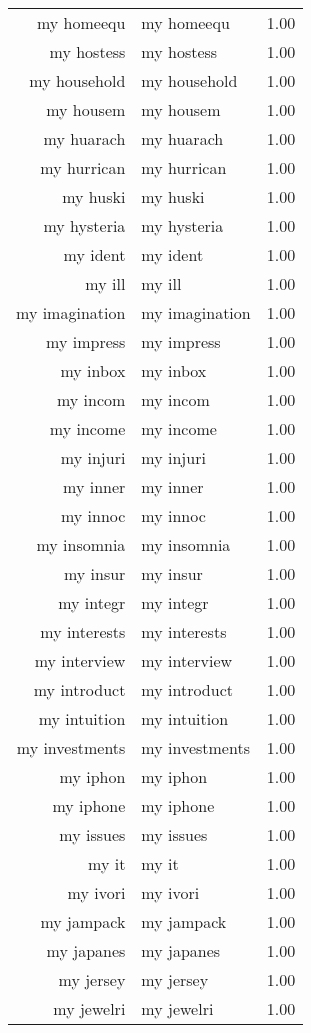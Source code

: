 \begin{table}[ht]
\begin{tabular}{rlr}
  my homeequ & my homeequ & 1.00 \\ 
  my hostess & my hostess & 1.00 \\ 
  my household & my household & 1.00 \\ 
  my housem & my housem & 1.00 \\ 
  my huarach & my huarach & 1.00 \\ 
  my hurrican & my hurrican & 1.00 \\ 
  my huski & my huski & 1.00 \\ 
  my hysteria & my hysteria & 1.00 \\ 
  my ident & my ident & 1.00 \\ 
  my ill & my ill & 1.00 \\ 
  my imagination & my imagination & 1.00 \\ 
  my impress & my impress & 1.00 \\ 
  my inbox & my inbox & 1.00 \\ 
  my incom & my incom & 1.00 \\ 
  my income & my income & 1.00 \\ 
  my injuri & my injuri & 1.00 \\ 
  my inner & my inner & 1.00 \\ 
  my innoc & my innoc & 1.00 \\ 
  my insomnia & my insomnia & 1.00 \\ 
  my insur & my insur & 1.00 \\ 
  my integr & my integr & 1.00 \\ 
  my interests & my interests & 1.00 \\ 
  my interview & my interview & 1.00 \\ 
  my introduct & my introduct & 1.00 \\ 
  my intuition & my intuition & 1.00 \\ 
  my investments & my investments & 1.00 \\ 
  my iphon & my iphon & 1.00 \\ 
  my iphone & my iphone & 1.00 \\ 
  my issues & my issues & 1.00 \\ 
  my it & my it & 1.00 \\ 
  my ivori & my ivori & 1.00 \\ 
  my jampack & my jampack & 1.00 \\ 
  my japanes & my japanes & 1.00 \\ 
  my jersey & my jersey & 1.00 \\ 
  my jewelri & my jewelri & 1.00 \\ 

\end{tabular}
\end{table}
